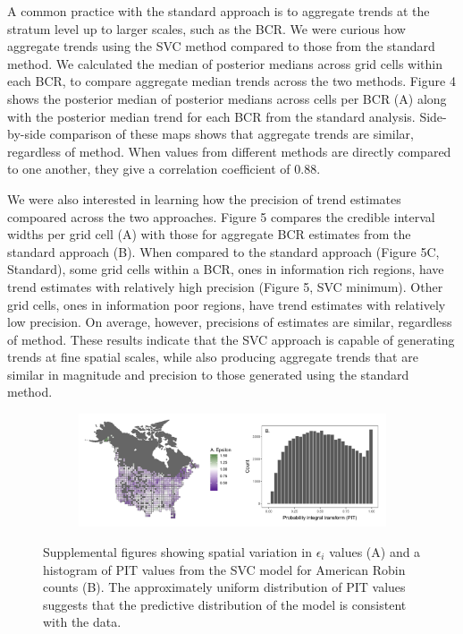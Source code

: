 \documentclass[]{article}
\begin{document}
A common practice with the standard approach is to aggregate trends at the stratum level up to larger scales, such as the BCR. We were curious how aggregate trends using the SVC method compared to those from the standard method.  We calculated the median of posterior medians across grid cells within each BCR, to compare aggregate median trends across the two methods. Figure 4 shows the posterior median of posterior medians across cells per BCR (A) along with the posterior median trend for each BCR from the standard analysis.  Side-by-side comparison of these maps shows that aggregate trends are similar, regardless of method. When values from different methods are directly compared to one another, they give a correlation coefficient of 0.88.

We were also interested in learning how the precision of trend estimates compoared across the two approaches. Figure 5 compares the credible interval widths per grid cell (A) with those for aggregate BCR estimates from the standard approach (B). When compared to the standard approach (Figure 5C, Standard), some grid cells within a BCR, ones in information rich regions, have trend estimates with relatively high precision (Figure 5, SVC minimum). Other grid cells, ones in information poor regions, have trend estimates with relatively low precision. On average, however, precisions of estimates are similar, regardless of method. These results indicate that the SVC approach is capable of generating trends at fine spatial scales, while also producing aggregate trends that are similar in magnitude and precision to those generated using the standard method.

\begin{figure}[p]
  \centering
  \begin{subfigure}{0.99\textwidth}
    \centering
    \includegraphics[width=\textwidth]{eps_pit} 
  \end{subfigure}
  \caption{Supplemental figures showing spatial variation in $\epsilon_i$ values (A) and a histogram of PIT values from the SVC model for American Robin counts (B). The approximately uniform distribution of PIT values suggests that the predictive distribution of the model is consistent with the data.}
\end{figure}
\end{document}
